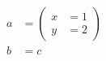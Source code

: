 \begin{align}
  a & = \left( \begin{aligned}
                 x & = 1 \\
                 y & = 2
               \end{aligned} \right) \\
  b & = c
\end{align}
